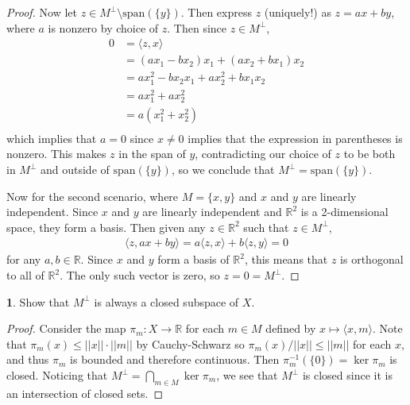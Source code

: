 \documentclass[12pt]{article}
\theoremstyle{definition}
\newtheorem{ex}{}
\begin{document}
\begin{proof}
	Now let $z \in M^\perp \setminus \mathrm{span}(\lbrace y \rbrace)$.
	Then express $z$ (uniquely!) as $z = ax + by$, where $a$ is nonzero by choice of $z$.
	Then since $z \in M^\perp$, \begin{align*}
		0 & = \langle z, x \rangle                \\
		  & = (ax_1 - bx_2)x_1 + (ax_2 + bx_1)x_2 \\
		  & = ax_1^2 - bx_2x_1 + ax_2^2 + bx_1x_2 \\
		  & = ax_1^2  + ax_2^2                    \\
		  & = a(x_1^2 + x_2^2)                    \\
	\end{align*}
	which implies that $a = 0$ since $x \neq 0$ implies that the expression in parentheses is nonzero.
	This makes $z$ in the span of $y$, contradicting our choice of $z$ to be both in $M^\perp$ and outside of $\mathrm{span}(\lbrace y \rbrace)$, so we conclude that $M^\perp = \mathrm{span}(\lbrace y \rbrace)$.

	Now for the second scenario, where $M = \lbrace x, y \rbrace$ and $x$ and $y$ are linearly independent.
	Since $x$ and $y$ are linearly independent and $\mathbb{R}^2$ is a 2-dimensional space, they form a basis.
	Then given any $z \in \mathbb{R}^2$ such that $z \in M^\perp$, \begin{align*}
		\langle z, ax + by \rangle = a \langle z, x \rangle + b \langle z, y \rangle = 0
	\end{align*}
	for any $a, b \in \mathbb{R}$.
	Since $x$ and $y$ form a basis of $\mathbb{R}^2$, this means that $z$ is orthogonal to all of $\mathbb{R}^2$.
	The only such vector is zero, so $z = 0 = M^\perp$.
\end{proof}

\begin{ex}
	Show that $M^\perp$ is always a closed subspace of $X$.
\end{ex}
\begin{proof}
	Consider the map $\pi_m : X \to \mathbb{R}$ for each $m \in M$ defined by $x \mapsto \langle x, m \rangle$.
	Note that $\pi_m(x) \leq ||x||\cdot||m||$ by Cauchy-Schwarz so $\pi_m(x)/||x|| \leq ||m||$ for each $x$, and thus $\pi_m$ is bounded and therefore continuous.
	Then $\pi_m^{-1}(\lbrace 0 \rbrace) = \ker \pi_m$ is closed.
	Noticing that $M^\perp = \bigcap_{m \in M} \ker\pi_m$, we see that $M^\perp$ is closed since it is an intersection of closed sets.
\end{proof}
\end{document}
